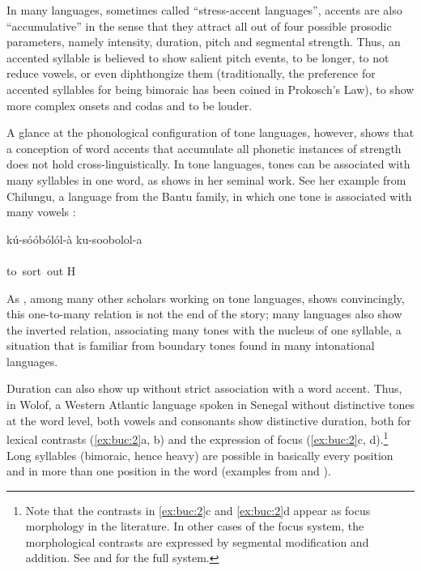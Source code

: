 \documentclass[output=paper]{LSP/langsci}
\begin{document}
In many languages, sometimes called ``stress-accent languages'', accents are also ``accumulative'' in the sense that they attract all out of four possible prosodic parameters, namely intensity, duration, pitch and segmental strength. Thus, an accented syllable is believed to show salient pitch events, to be longer, to not reduce vowels, or even diphthongize them (traditionally, the preference for accented syllables for being bimoraic has been coined in Prokosch’s Law), to show more complex onsets and codas and to be louder. 

A glance at the phonological configuration of tone languages, however, shows that a conception of word accents that accumulate all phonetic instances of \linebreak strength does not hold cross-linguistically. In tone languages, tones can be associated with many syllables in one word, as \citet{Yip2002} shows in her seminal work. See her example from Chilungu, a language from the Bantu family, in which one tone is associated with many vowels \citep[68]{Yip2002}:


\ea
\label{ex:buc:1}  
\glll kú-sóóbólól-à   ku-soobolol-a\\
      ~				~ \\
     to~sort~out     H  \\
     
\z
{}

As \citet{Yip2002}, among many other scholars working on tone languages, shows convincingly, this one-to-many relation is not the end of the story; many languages also show the inverted relation, associating many tones with the nucleus of one syllable, a situation that is familiar from boundary tones found in many intonational languages.

Duration can also show up without strict association with a word accent. Thus, in Wolof, a Western Atlantic language spoken in Senegal without distinctive tones at the word level, both vowels and consonants show distinctive duration, both for lexical contrasts (\ref{ex:buc:2}a, b) and the expression of focus (\ref{ex:buc:2}c, d).\footnote{Note that the contrasts in \ref{ex:buc:2}c and \ref{ex:buc:2}d appear as focus morphology in the literature. In other cases of the focus system, the morphological contrasts are expressed by segmental modification and addition. See \citet{Voisin-Nouguier2002} and \citet{Rialland2001} for the full system.} Long syllables (bimoraic, hence heavy) are possible in basically every position  and in more than one position in the word  (examples from \citealt{Ka1989,Ka1994} and \citealt{Voisin-Nouguier2002}).
\end{document}
